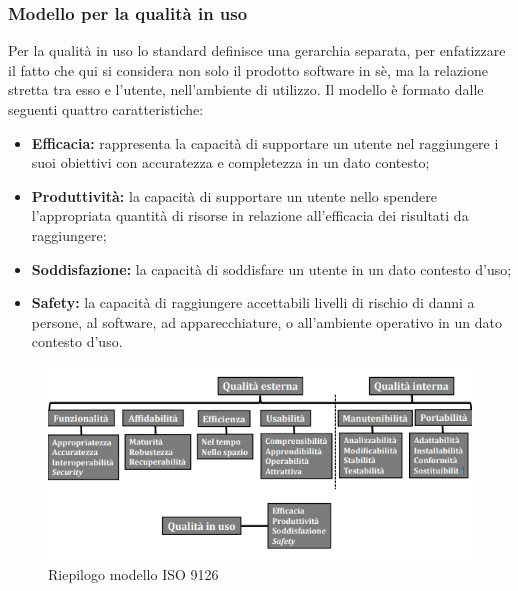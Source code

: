 	  \subsubsection{Modello per la qualità in uso}
	  Per la qualità in uso lo standard definisce una gerarchia separata, per enfatizzare il fatto che qui si considera non solo il prodotto software in sè, ma la relazione stretta tra esso e l'utente, nell'ambiente di utilizzo. Il modello è formato dalle seguenti quattro caratteristiche:
	  \begin{itemize}
	  \item \textbf{Efficacia:} rappresenta la capacità di supportare un utente nel raggiungere i suoi obiettivi con accuratezza e completezza in un dato contesto;
	  \item \textbf{Produttività:} la capacità di supportare un utente nello spendere l’appropriata quantità di risorse in relazione all’efficacia dei risultati da raggiungere; 
	  \item \textbf{Soddisfazione:} la capacità di soddisfare un utente in un dato contesto d’uso;
	  \item \textbf{Safety:} la capacità di raggiungere accettabili livelli di rischio di
danni a persone, al software, ad apparecchiature, o all’ambiente operativo in un dato contesto d’uso.
	\end{itemize}
	\begin{figure}[htbp]
		\centering
		\includegraphics{images/gerarchiaQualitaProdotto.png}
		\caption{Riepilogo modello ISO 9126}
	\end{figure}